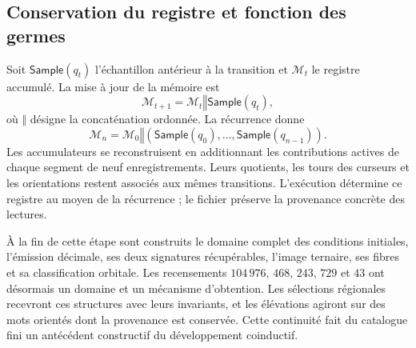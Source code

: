 \subsection{Conservation du registre et fonction des germes}
\label{act21:tpk:conclusion}

Soit \(\mathsf{Sample}(q_t)\) l'échantillon antérieur à la transition et \(\mathcal M_t\) le registre accumulé. La mise à jour de la mémoire est
\begin{equation}
 \mathcal M_{t+1}=\mathcal M_t\mathbin{\Vert}\mathsf{Sample}(q_t),
 \label{act21:tpk:archivo}
\end{equation}
où \(\Vert\) désigne la concaténation ordonnée. La récurrence donne
\[
 \mathcal M_n=\mathcal M_0\mathbin{\Vert}
 (\mathsf{Sample}(q_0),\ldots,\mathsf{Sample}(q_{n-1})).
\]
Les accumulateurs se reconstruisent en additionnant les contributions actives de
chaque segment de neuf enregistrements. Leurs quotients, les tours des
curseurs et les orientations restent associés aux mêmes transitions.
L'exécution détermine ce registre au moyen de la récurrence ; le fichier
préserve la provenance concrète des lectures.





À la fin de cette étape sont construits le domaine complet des conditions
initiales, l'émission décimale, ses deux signatures récupérables, l'image ternaire,
ses fibres et sa classification orbitale. Les recensements \(104\,976\), \(468\),
\(243\), \(729\) et \(43\) ont désormais un domaine et un mécanisme d'obtention.
Les sélections régionales recevront ces structures avec leurs invariants,
et les élévations agiront sur des mots orientés dont la provenance est
conservée. Cette continuité fait du catalogue fini un antécédent
constructif du développement coinductif.

